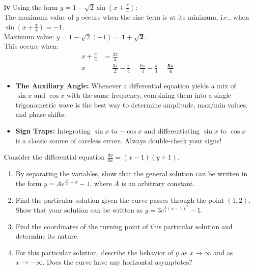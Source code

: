 \begin{solution}
\vspace{0.3cm}
\textbf{iv} Using the form $y = 1 - \sqrt{2}\sin\left(x + \frac{\pi}{4}\right)$: \\
The maximum value of $y$ occurs when the sine term is at its minimum, i.e., when $\sin\left(x + \frac{\pi}{4}\right) = -1$. \\
Maximum value: $y = 1 - \sqrt{2}(-1) = \mathbf{1 + \sqrt{2}}$. \\
This occurs when:
\begin{align*}
    x + \frac{\pi}{4} &= \frac{3\pi}{2} \\
    x &= \frac{3\pi}{2} - \frac{\pi}{4} = \frac{6\pi}{4} - \frac{\pi}{4} = \mathbf{\frac{5\pi}{4}}
\end{align*}
\end{solution}

\begin{takeaways}
\begin{itemize}[leftmargin=*]
    \item \textbf{The Auxiliary Angle:} Whenever a differential equation yields a mix of $\sin x$ and $\cos x$ with the same frequency, combining them into a single trigonometric wave is the best way to determine amplitude, max/min values, and phase shifts.
    \item \textbf{Sign Traps:} Integrating $\sin x$ to $-\cos x$ and differentiating $\sin x$ to $\cos x$ is a classic source of careless errors. Always double-check your signs!
\end{itemize}
\end{takeaways}

\vspace{1cm}

\begin{problem}
Consider the differential equation $\frac{dy}{dx} = (x-1)(y+1)$.

\begin{enumerate}
    \item[\textbf{i}] By separating the variables, show that the general solution can be written in the form $y = A e^{\frac{x^2}{2} - x} - 1$, where $A$ is an arbitrary constant.
    \item[\textbf{ii}] Find the particular solution given the curve passes through the point $(1, 2)$. Show that your solution can be written as $y = 3e^{\frac{1}{2}(x-1)^2} - 1$.
    \item[\textbf{iii}] Find the coordinates of the turning point of this particular solution and determine its nature.
    \item[\textbf{iv}] For this particular solution, describe the behavior of $y$ as $x \to \infty$ and as $x \to -\infty$. Does the curve have any horizontal asymptotes?
\end{enumerate}
\end{problem}

